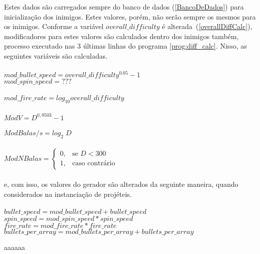 Estes dados são carregados sempre do banco de dados (\ref{BancoDeDados}) para inicialização dos inimigos. Estes valores, porém, não serão sempre os mesmos para os inimigos. Conforme a variável $overall\_difficulty$ é alterada~(\ref{overallDiffCalc}), modificadores para estes valores são calculados dentro dos inimigos também, processo executado nas 3 últimas linhas do programa \ref{prog:diff_calc}. Nisso, as seguintes variáveis são calculadas.\\
\\
$mod\_bullet\_speed = overall\_difficulty^{0.05} - 1$\\
$mod\_spin\_speed = ???$\\\\
$mod\_fire\_rate = log_{10} overall\_difficulty$\\\\
$ModV = D^{0,0503} - 1$\\\\
$ModBalas/s = log_2\;D$\\\\
$ModNBalas =  \begin{cases}
                                0,& \text{se } D< 300\\
                                1,              & \text{caso contrário}
                            \end{cases}$\\
\\
e, com isso, os valores do gerador são alterados da seguinte maneira, quando considerados na instanciação de projéteis.\\
\\
$bullet\_speed = mod\_bullet\_speed + bullet\_speed$\\
$spin\_speed = mod\_spin\_speed * spin\_speed$\\
$fire\_rate = mod\_fire\_rate * fire\_rate$\\
$bullets\_per\_array = mod\_bullets\_per\_array + bullets\_per\_array$

aaaaaa


